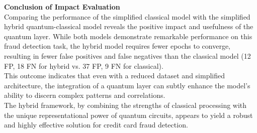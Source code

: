 \documentclass[10pt]{article}
\begin{document}
\noindent \textbf{Conclusion of Impact Evaluation} \\
Comparing the performance of the simplified classical model with the simplified hybrid quantum-classical model reveals the positive impact and usefulness of the quantum layer. While both models demonstrate remarkable performance on this fraud detection task, the hybrid model requires fewer epochs to converge, resulting in fewer false positives and false negatives than the classical model (12 FP, 18 FN for hybrid vs. 37 FP, 9 FN for classical). \\
This outcome indicates that even with a reduced dataset and simplified architecture, the integration of a quantum layer can subtly enhance the model's ability to discern complex patterns and correlations.\\
The hybrid framework, by combining the strengths of classical processing with the unique representational power of quantum circuits, appears to yield a robust and highly effective solution for credit card fraud detection.
\end{document}
